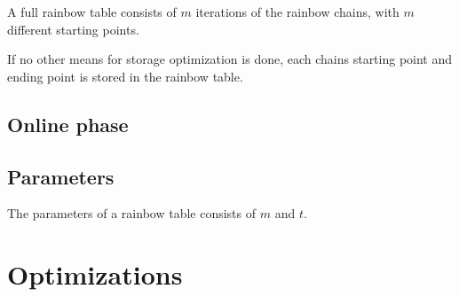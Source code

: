A full rainbow table consists of $m$ iterations of the rainbow chains,
with $m$ different starting points.

If no other means for storage optimization is done, each chains
starting point and ending point is stored in the rainbow table. 

\subsection{Online phase}




\subsection{Parameters}

The parameters of a rainbow table consists of $m$ and $t$.

\section{Optimizations}
















